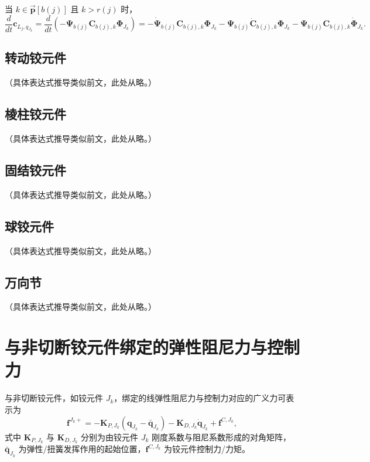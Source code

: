 当 $k \in \vec{\boldsymbol{p}}[b(j)]$ 且 $k > r(j)$ 时，
\begin{equation}\label{eq:11.25}
\frac{d}{dt} \boldsymbol{c}_{L_j,q_{J_k}} = \frac{d}{dt} \left( -\boldsymbol{\Psi}_{b(j)} \boldsymbol{C}_{b(j),k} \boldsymbol{\Phi}_{J_k} \right)
= -\dot{\boldsymbol{\Psi}}_{b(j)} \boldsymbol{C}_{b(j),k} \boldsymbol{\Phi}_{J_k} - \boldsymbol{\Psi}_{b(j)} \dot{\boldsymbol{C}}_{b(j),k} \boldsymbol{\Phi}_{J_k} - \boldsymbol{\Psi}_{b(j)} \boldsymbol{C}_{b(j),k} \dot{\boldsymbol{\Phi}}_{J_k}.
\end{equation}

\subsection{转动铰元件}

（具体表达式推导类似前文，此处从略。）

\subsection{棱柱铰元件}

（具体表达式推导类似前文，此处从略。）

\subsection{固结铰元件}

（具体表达式推导类似前文，此处从略。）

\subsection{球铰元件}

（具体表达式推导类似前文，此处从略。）

\subsection{万向节}

（具体表达式推导类似前文，此处从略。）

\section{与非切断铰元件绑定的弹性阻尼力与控制力}

与非切断铰元件，如铰元件 $J_k$，绑定的线弹性阻尼力与控制力对应的广义力可表示为
\begin{equation}\label{eq:11.26}
\boldsymbol{f}^{J_k+} = -\boldsymbol{K}_{P,J_k} (\boldsymbol{q}_{J_k} - \bar{\boldsymbol{q}}_{J_k}) - \boldsymbol{K}_{D,J_k} \dot{\boldsymbol{q}}_{J_k} + \boldsymbol{f}^{C,J_k},
\end{equation}
式中 $\boldsymbol{K}_{P,J_k}$ 与 $\boldsymbol{K}_{D,J_k}$ 分别为由铰元件 $J_k$ 刚度系数与阻尼系数形成的对角矩阵，$\bar{\boldsymbol{q}}_{J_k}$ 为弹性/扭簧发挥作用的起始位置，$\boldsymbol{f}^{C,J_k}$ 为铰元件控制力/力矩。

